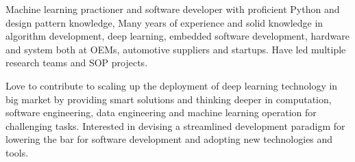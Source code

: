 \documentclass[../resume_xin.tex]{subfiles}
\begin{document}


\begin{cvparagraph}

Machine learning practioner and software developer with proficient Python and design pattern knowledge, Many years of experience and solid knowledge in algorithm development, deep learning, embedded software development, hardware and system both at OEMs, automotive suppliers and startups. Have led multiple research teams and SOP projects.

Love to contribute to scaling up the deployment of deep learning technology in big market by providing smart solutions and thinking deeper in computation, software engineering, data engineering and machine learning operation for challenging tasks. Interested in devising a streamlined development paradigm for lowering the bar for software development and adopting new technologies and tools.

\end{cvparagraph}
\end{document}
